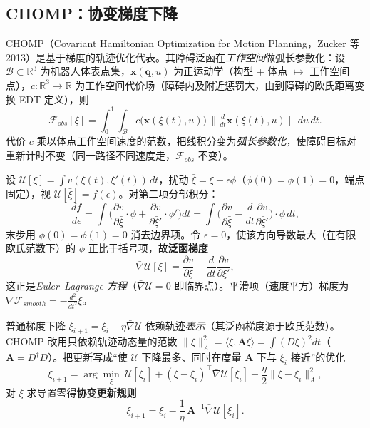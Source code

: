 \subsection{CHOMP：协变梯度下降}
\label{sec:plan-chomp}

CHOMP（Covariant Hamiltonian Optimization for Motion Planning，Zucker 等 2013\cite{zucker2013chomp}）是基于梯度的轨迹优化代表。其障碍泛函在\emph{工作空间}做弧长参数化：设 $\mathcal{B}\subset\mathbb{R}^3$ 为机器人体表点集，$\mathbf{x}(\mathbf{q},u)$ 为正运动学（构型 + 体点 $\mapsto$ 工作空间点），$c:\mathbb{R}^3\to\mathbb{R}$ 为工作空间代价场（障碍内及附近惩罚大，由到障碍的欧氏距离变换 EDT 定义），则
\begin{equation}
  \mathcal{F}_{obs}[\xi]=\int_0^1\!\!\int_{\mathcal{B}}c\big(\mathbf{x}(\xi(t),u)\big)\,\Big\|\tfrac{d}{dt}\mathbf{x}(\xi(t),u)\Big\|\,du\,dt.
  \label{eq:plan-chomp-obs}
\end{equation}
代价 $c$ 乘以体点工作空间速度的范数，把线积分变为\emph{弧长参数化}，使障碍目标对重新计时不变（同一路径不同速度走，$\mathcal{F}_{obs}$ 不变）。

\begin{derivation}\label{der:plan-chomp}
设 $\mathcal{U}[\xi]=\int v(\xi(t),\xi'(t))\,dt$，扰动 $\bar\xi=\xi+\epsilon\phi$（$\phi(0)=\phi(1)=0$，端点固定），视 $\mathcal{U}[\bar\xi]=f(\epsilon)$。对第二项分部积分：
\[
  \frac{df}{d\epsilon}=\int\Big(\frac{\partial v}{\partial\bar\xi}\cdot\phi+\frac{\partial v}{\partial\bar\xi'}\cdot\phi'\Big)dt
  =\int\Big(\frac{\partial v}{\partial\bar\xi}-\frac{d}{dt}\frac{\partial v}{\partial\bar\xi'}\Big)\cdot\phi\,dt,
\]
末步用 $\phi(0)=\phi(1)=0$ 消去边界项。令 $\epsilon=0$，使该方向导数最大（在有限欧氏范数下）的 $\phi$ 正比于括号项，故\textbf{泛函梯度}
\begin{equation}
  \bar\nabla\mathcal{U}[\xi]=\frac{\partial v}{\partial\xi}-\frac{d}{dt}\frac{\partial v}{\partial\xi'},
  \label{eq:plan-funcgrad}
\end{equation}
这正是\emph{Euler--Lagrange 方程}（$\bar\nabla\mathcal{U}=0$ 即临界点）。平滑项（速度平方）梯度为 $\bar\nabla\mathcal{F}_{smooth}=-\tfrac{d^2}{dt^2}\xi$。
\end{derivation}

\begin{theorem}\label{thm:plan-chomp-update}
普通梯度下降 $\xi_{i+1}=\xi_i-\eta\bar\nabla\mathcal{U}$ 依赖轨迹\emph{表示}（其泛函梯度源于欧氏范数）。CHOMP 改用只依赖轨迹动态量的范数 $\|\xi\|_A^2=\langle\xi,\mathbf{A}\xi\rangle=\int(D\xi)^2dt$（$\mathbf{A}=D^\dagger D$）。把更新写成“使 $\mathcal{U}$ 下降最多、同时在度量 $\mathbf{A}$ 下与 $\xi_i$ 接近”的优化
\[
  \xi_{i+1}=\arg\min_\xi\ \mathcal{U}[\xi_i]+(\xi-\xi_i)^\top\bar\nabla\mathcal{U}[\xi_i]+\frac\eta2\|\xi-\xi_i\|_A^2,
\]
对 $\xi$ 求导置零得\textbf{协变更新规则}
\begin{equation}
  \xi_{i+1}=\xi_i-\frac1\eta\,\mathbf{A}^{-1}\bar\nabla\mathcal{U}[\xi_i].
  \label{eq:plan-chomp-update}
\end{equation}
\end{theorem}

